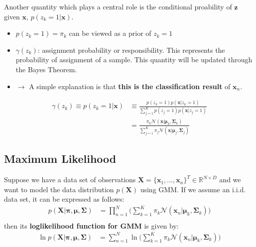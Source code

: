 Another quantity which plays a central role is the conditional proability of $\mathbf{z}$ given $\mathbf{x}$, $p(z_k=1|\mathbf{x})$. 
\begin{itemize}
\item $p(z_k=1) = \pi_k$ can be viewed as a prior of $z_k=1$
\item $\gamma(z_k)$: assignment probability or responsibility. This represents the probability of assignment of a sample.  This quantity will be updated through the Bayes Theorem.
\item[] $\rightarrow$  A simple explanation is that \textbf{this is the classification result} of $\mathbf{x}_n$.
\end{itemize}
\begin{align*}
\gamma(z_k) \equiv p(z_k=1|\mathbf{x}) & \equiv \frac{p(z_k=1)p(\mathbf{x}|z_k=1)}{\sum_{j=1}^{K}p(z_j=1)p(\mathbf{x}|z_j=1)} \\
& = \frac{\pi_k\mathcal{N}(\mathbf{x}|\boldsymbol{\mu}_k, \boldsymbol{\Sigma}_k)}{\sum_{j=1}^{K} \pi_j\mathcal{N}(\mathbf{x}|\boldsymbol{\mu}_j, \boldsymbol{\Sigma}_j)}
\end{align*}

\subsection{Maximum Likelihood}
Suppose we have a data set of observations $\mathbf{X}=\{\mathbf{x}_1,...,\mathbf{x}_n\}^{T}\in\mathbb{R}^{N\times D}$ and we want to model the data distribution $p(\mathbf{X})$ using GMM. If we assume an \textrm{i.i.d.} data set, it can be expressed as follows: 
\begin{align*}
p(\mathbf{X}|\boldsymbol{\pi},\boldsymbol{\mu},\boldsymbol{\Sigma}) &=\prod_{n=1}^{N}\Bigg(\sum_{k=1}^{K}\pi_k\mathcal{N}(\mathbf{x}_n|\boldsymbol{\mu}_k, \boldsymbol{\Sigma}_k)\Bigg)\\
\end{align*}
then its \textbf{loglikelihood function for GMM} is given by:
\begin{align*}
\ln p(\mathbf{X}|\boldsymbol{\pi},\boldsymbol{\mu},\boldsymbol{\Sigma}) &= \sum_{n=1}^{N}\ln \Bigg(\sum_{k=1}^{K}\pi_k\mathcal{N}(\mathbf{x}_n|\boldsymbol{\mu}_k, \boldsymbol{\Sigma}_k)\Bigg)
\end{align*}

